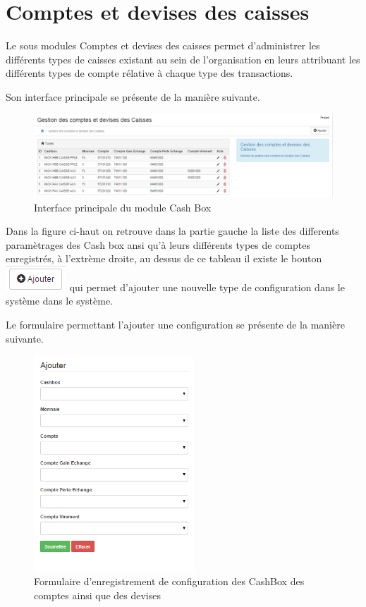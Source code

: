 \documentclass[12pt,a4paper]{report}
\begin{document}
\newpage
\section{Comptes et devises des caisses}
Le sous modules Comptes et devises des caisses permet d'administrer les différents types de caisses existant au sein de l'organisation en leurs attribuant les différents types de compte rélative à chaque type des transactions.

Son interface principale se présente de la manière suivante.

\begin{figure}[h]
\begin{center}
\includegraphics[width=14cm]{pic/ComptDevise.png}
\end{center}
\caption{Interface principale du module Cash Box}
\label{Interface principale du module Cash Box}
\end{figure} 

Dans la figure ci-haut on retrouve dans la partie gauche la liste des differents paramètrages des Cash box ansi qu'à leurs différents types de comptes enregistrés, à l'extrème droite, au dessus de ce tableau il existe le bouton \includegraphics[scale=1]{pic/AddNewStore.png} qui permet d'ajouter une nouvelle type de configuration dans le système dans le système.

Le formulaire permettant l'ajouter une configuration se présente de la manière suivante.
\begin{figure}[h]
\begin{center}
\includegraphics[width=6cm]{pic/AddConfigCash.png}
\end{center}
\caption{Formulaire d'enregistrement de configuration des CashBox des comptes ainsi que des devises}
\label{Formulaire d'enregistrement de configuration des CashBox des comptes ainsi que des devises}
\end{figure} 
\end{document}
